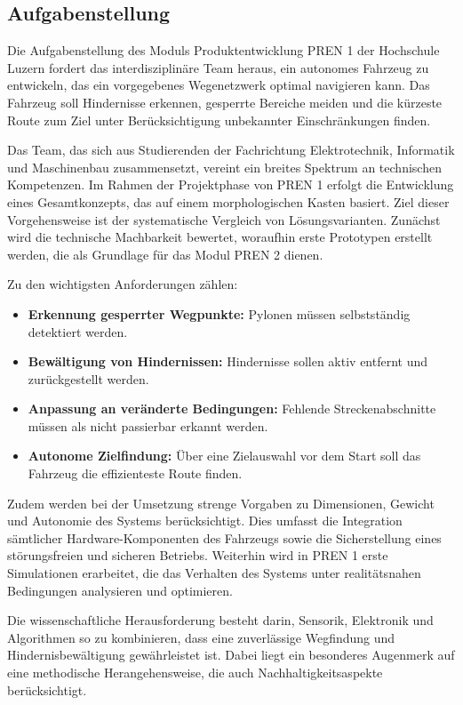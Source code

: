 \documentclass[main.tex]{subfiles} %
\begin{document}

\subsection{Aufgabenstellung}

Die Aufgabenstellung des Moduls Produktentwicklung PREN 1 der
Hochschule Luzern fordert das interdisziplinäre Team heraus, ein autonomes 
Fahrzeug zu entwickeln, das ein vorgegebenes Wegenetzwerk optimal navigieren kann. 
Das Fahrzeug soll Hindernisse erkennen, gesperrte Bereiche meiden und die kürzeste 
Route zum Ziel unter Berücksichtigung unbekannter Einschränkungen finden.

Das Team, das sich aus Studierenden der Fachrichtung Elektrotechnik, Informatik und Maschinenbau 
zusammensetzt, vereint ein breites Spektrum an technischen Kompetenzen. Im Rahmen der Projektphase von PREN 1 
erfolgt die Entwicklung eines Gesamtkonzepts, das auf einem morphologischen Kasten basiert. 
Ziel dieser Vorgehensweise ist der systematische Vergleich von Lösungsvarianten. Zunächst wird die technische
Machbarkeit bewertet, woraufhin erste Prototypen erstellt werden, die als Grundlage für das Modul PREN 2 dienen.

Zu den wichtigsten Anforderungen zählen:
\begin{itemize}
    \item \textbf{Erkennung gesperrter Wegpunkte:} Pylonen müssen selbstständig detektiert werden.
    \item \textbf{Bewältigung von Hindernissen:} Hindernisse sollen aktiv entfernt und zurückgestellt werden.
    \item \textbf{Anpassung an veränderte Bedingungen:} Fehlende Streckenabschnitte müssen als nicht passierbar erkannt werden.
    \item \textbf{Autonome Zielfindung:} Über eine Zielauswahl vor dem Start soll das Fahrzeug die effizienteste Route finden.
\end{itemize}

Zudem werden bei der Umsetzung strenge Vorgaben zu Dimensionen, Gewicht und
Autonomie des Systems berücksichtigt. Dies umfasst die Integration sämtlicher
Hardware-Komponenten des Fahrzeugs sowie die Sicherstellung eines
störungsfreien und sicheren Betriebs. Weiterhin wird in PREN 1 erste
Simulationen erarbeitet, die das Verhalten des Systems unter realitätsnahen Bedingungen
analysieren und optimieren.

Die wissenschaftliche Herausforderung besteht darin, Sensorik, Elektronik 
und Algorithmen so zu kombinieren, dass eine zuverlässige Wegfindung und 
Hindernisbewältigung gewährleistet ist. Dabei liegt ein besonderes Augenmerk auf 
eine methodische Herangehensweise, die auch Nachhaltigkeitsaspekte berücksichtigt.
\end{document}
